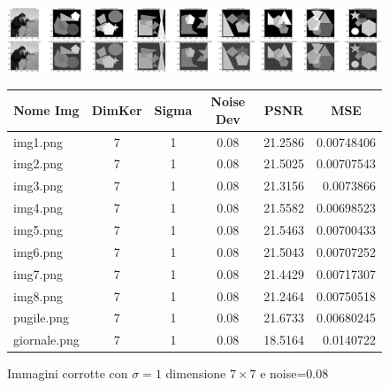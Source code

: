 \begin{figure}[H]
    \centering
    \begin{minipage}[h]{\textwidth}
    \includegraphics[width=\linewidth]{output/tabCorrotte/imgcorr8.png}\label{fig:imgcorrotte7x70.08}
    \end{minipage}
    \begin{minipage}[h]{\textwidth}
        \centering
        
        \begin{tabular}{|l c c c c r|}
            \hline
            \multicolumn{1}{|c}{\textbf{Nome Img}} & \multicolumn{1}{|c}{\textbf{DimKer}} & \multicolumn{1}{|c}{\textbf{Sigma}} & \multicolumn{1}{|c}{\textbf{Noise Dev}} & \multicolumn{1}{|c}{\textbf{PSNR}} & \multicolumn{1}{|c|}{\textbf{MSE}} \\ \hline
                img1.png & 7 & 1 & 0.08 & 21.2586 & 0.00748406 \\
                img2.png & 7 & 1 & 0.08 & 21.5025 & 0.00707543 \\
                img3.png & 7 & 1 & 0.08 & 21.3156 & 0.0073866 \\                 
                img4.png & 7 & 1 & 0.08 & 21.5582 & 0.00698523 \\
                img5.png & 7 & 1 & 0.08 & 21.5463 & 0.00700433 \\
                img6.png & 7 & 1 & 0.08 & 21.5043 & 0.00707252 \\
                img7.png & 7 & 1 & 0.08 & 21.4429 & 0.00717307 \\
                img8.png & 7 & 1 & 0.08 & 21.2464 & 0.00750518 \\
                pugile.png & 7 & 1 & 0.08 & 21.6733 & 0.00680245 \\
                giornale.png & 7 & 1 & 0.08 & 18.5164 & 0.0140722 \\ \hline
            \end{tabular}\label{tab:tabcorrotte7x70.08}
        \end{minipage}
    \captionsetup{labelformat=andtable}
    \caption{Immagini corrotte con $\sigma = 1$ dimensione $7 \times 7$ e noise=0.08}
\end{figure}

